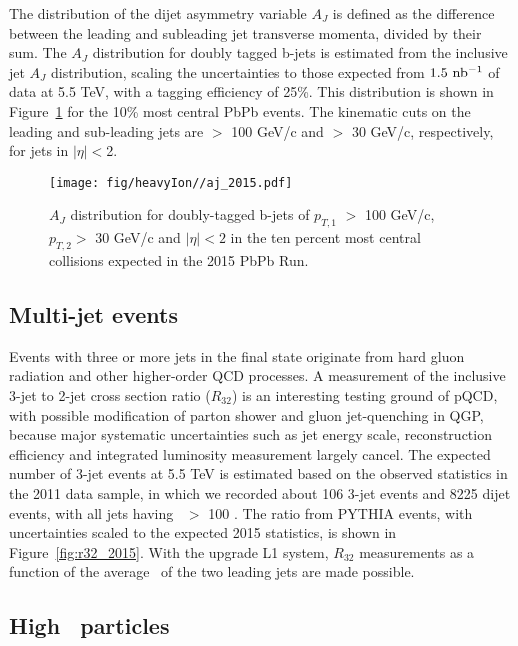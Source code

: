 The distribution of the dijet asymmetry variable $A_{J}$ is defined as the
difference between the leading and subleading jet transverse momenta,
divided by their sum.  
The $A_{J}$ distribution for doubly tagged b-jets is estimated from the
inclusive jet $A_{J}$ distribution, 
scaling the uncertainties to those expected from $1.5\ {\rm nb^{-1}}$ of data at
5.5 TeV, with a tagging efficiency of 25\%.  This distribution is shown in
Figure~\ref{fig:aj_2015} for the 10\% most central PbPb events.  
The kinematic cuts on the leading and sub-leading jets are \pt $>$ 100 GeV/c
and \pt $>$ 30 GeV/c, respectively, for jets in $|\eta| < $2.  


\begin{figure}[!ht]
\begin{center}
\texttt{[image: fig/heavyIon//aj\_2015.pdf]}
\caption{$A_{J}$ distribution for doubly-tagged b-jets of $p_{T,1}$ $> $ 100
GeV/c, $p_{T,2} > $ 30 GeV/c and $|\eta| < 2$ 
in the ten percent most central collisions expected in the 2015 PbPb Run.}
\label{fig:aj_2015}
\end{center}
\end{figure}

\subsection{Multi-jet events}

Events with three or more jets in the final state originate from hard gluon radiation and 
other higher-order QCD processes. A measurement of the inclusive 3-jet to 2-jet cross section 
ratio ($R_{32}$) is an interesting testing ground of pQCD, with possible modification of 
parton shower and gluon jet-quenching in QGP, because major systematic uncertainties such as 
jet energy scale, reconstruction efficiency and integrated luminosity measurement largely cancel. 
The expected number of 3-jet events at 5.5 TeV is estimated based on the observed statistics in the 2011 data sample, 
in which we recorded about 106 3-jet events and 8225 dijet events, with all jets having \pt\ $>$ 100 \GeVc.  
The ratio from PYTHIA events, with uncertainties scaled to the expected
2015 statistics, is shown in Figure~\ref{fig:r32_2015}. 
With the upgrade L1 system, $R_{32}$ measurements as a function of the
average \pt\ of the two leading jets are made possible.


\subsection{High \pt\ particles}

